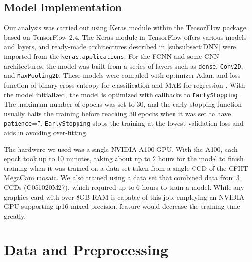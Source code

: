 \documentclass{aastex631}
\begin{document}
\subsection{Model Implementation}
Our analysis was carried out using Keras module within the TensorFlow package based on TensorFlow 2.4. 
The Keras module in TensorFlow offers various models and layers, and ready-made architectures described in \ref{subsubsect:DNN} were imported from the \texttt{keras.applications}.
For the FCNN and some CNN architectures, the model was built from a series of layers such as \texttt{dense}, \texttt{Conv2D}, and \texttt{MaxPooling2D}.
These models were compiled with optimizer Adam and loss function of binary cross-entropy for classification and MAE for regression \citep{kingma2017adam}.
With the model initialized, the model is optimized with callbacks to \texttt{EarlyStopping} \citep{Zhang2017UnderstandingDL}.
The maximum number of epochs was set to 30, and the early stopping function usually halts the training before reaching 30 epochs when it was set to have \texttt{patience}=7. 
\texttt{EarlyStopping} stops the training at the lowest validation loss and aids in avoiding over-fitting.

The hardware we used was a single NVIDIA A100 GPU.
With the A100, each epoch took up to 10 minutes, taking about up to 2 hours for the model to finish training when it was trained on a data set taken from a single CCD of the CFHT MegaCam mosaic. 
We also trained using a data set that combined data from 3 CCDs (C051020M27), which required up to 6 hours to train a model.
While any graphics card with over 8GB RAM is capable of this job, employing an NVIDIA GPU supporting fp16 mixed precision feature would decrease the training time greatly.

\section{Data and Preprocessing}
\label{sect: Data}
\end{document}
